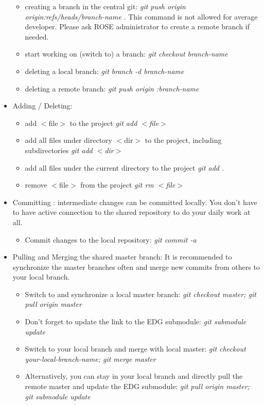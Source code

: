 \begin{itemize}
\begin{itemize}
          \item creating a branch in the central git: \textit{git push origin origin:refs/heads/branch-name} . This command is not allowed for average developer. Please ask ROSE administrator to create a remote branch if needed.
          \item start working on (switch to) a branch: \textit{git checkout branch-name} 
          \item deleting a local branch: \textit{git branch -d branch-name} 
          \item deleting a remote branch: \textit{git push origin :branch-name } 
   \end{itemize}     
\item Adding / Deleting:
   \begin{itemize}
          \item add $<$file$>$ to the project \textit{git add $<$file$>$}
          \item add all files under directory $<$dir$>$ to the project, including subdirectories \textit{git add $<$dir$>$}
	  \item add all files under the current directory to the project \textit{git add .}
	  \item remove $<$file$>$ from the project \textit{git rm $<$file$>$}
   \end{itemize}     
\item Committing : intermediate changes can be committed locally. You don't have to have active connection to the shared repository to do your daily work at all. 
   \begin{itemize}
          \item Commit changes to the local repository: \textit{git commit -a} 
   \end{itemize}   
\item Pulling and Merging the shared master branch: It is recommended to synchronize the master branches often and merge new commits from others to  your local branch. 
   \begin{itemize}
          \item Switch to and synchronize a local master branch: \textit{git checkout master; git pull origin master}
          \item Don't forget to update the link to the EDG submodule: \textit{git submodule update}
          \item Switch to your local branch and merge with local master: \textit{git checkout your-local-branch-name; git merge master}
    \item Alternatively, you can stay in your local branch and directly pull the remote master and update the EDG submodule: 
           \textit{git pull origin master; git submodule update}
   \end{itemize}   


\end{itemize}
